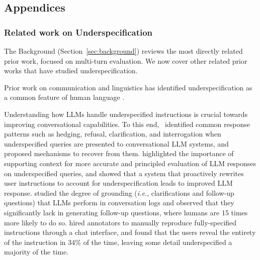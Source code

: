 \documentclass{article}
\begin{document}
\clearpage
\begin{appendices}

\part*{Appendices}

\section{Related work on Underspecification} \label{app:rel_work}

The Background (Section~\ref{sec:background}) reviews the most directly related prior work, focused on multi-turn evaluation. We now cover other related prior works that have studied underspecification.


Prior work on communication and linguistics has identified underspecification as a common feature of human language \cite{Lappin2000AnIP,ferreira2008ambiguity,Frisson2009SemanticUI,pezzelle2023dealing}.

Understanding how LLMs handle underspecified instructions is crucial towards improving conversational capabilities.
To this end,~\citet{herlihy2024overcoming} identified common response patterns such as hedging, refusal, clarification, and interrogation when underspecified queries are presented to conversational LLM systems, and proposed mechanisms to recover from them.
\citet{malaviya2024contextualized} highlighted the importance of supporting context for more accurate and principled evaluation of LLM responses on underspecified queries, and \citet{Sarkar2025ConversationalUI} showed that a system that proactively rewrites user instructions to account for underspecification leads to improved LLM response. \citet{shaikh2025navigating} studied the degree of grounding (\textit{i.e.}, clarifications and follow-up questions) that LLMs perform in conversation logs and observed that they significantly lack in generating follow-up questions, where humans are 15 times more likely to do so. \citet{chang2025chatbench} hired annotators to manually reproduce fully-specified instructions through a chat interface, and found that the users reveal the entirety of the instruction in 34\% of the time, leaving some detail underspecified a majority of the time.


\end{appendices}
\end{document}

